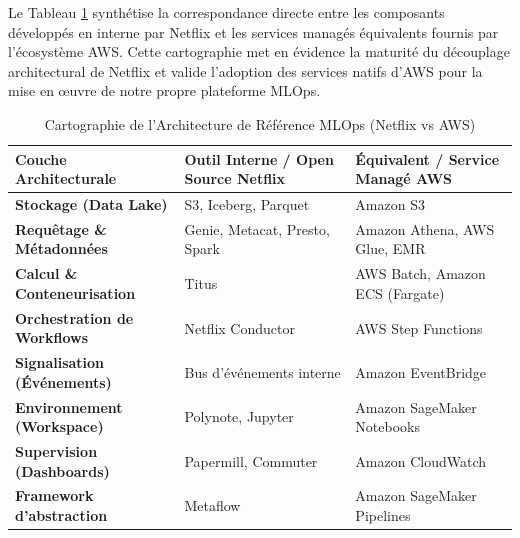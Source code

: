 Le Tableau \ref{tab:netflix_aws_mapping} synthétise la correspondance directe entre les composants développés en interne par Netflix et les services managés équivalents fournis par l'écosystème AWS. Cette cartographie met en évidence la maturité du découplage architectural de Netflix et valide l'adoption des services natifs d'AWS pour la mise en œuvre de notre propre plateforme MLOps.

\begin{table}[H]
\centering
\caption{Cartographie de l'Architecture de Référence MLOps (Netflix vs AWS)}
\label{tab:netflix_aws_mapping}
\renewcommand{\arraystretch}{1.3}
\begin{tabular}{|p{4.5cm}|p{5cm}|p{5cm}|}
\hline
\rowcolor{darkgreen!20} \textbf{Couche Architecturale} & \textbf{Outil Interne / Open Source Netflix} & \textbf{Équivalent / Service Managé AWS} \\ \hline
\textbf{Stockage (Data Lake)} & S3, Iceberg, Parquet \cite{76} & Amazon S3 \cite{76} \\ \hline
\textbf{Requêtage \& Métadonnées} & Genie, Metacat, Presto, Spark \cite{76} & Amazon Athena, AWS Glue, EMR \\ \hline
\textbf{Calcul \& Conteneurisation} & Titus \cite{76} & AWS Batch, Amazon ECS (Fargate) \cite{76} \\ \hline
\textbf{Orchestration de Workflows} & Netflix Conductor \cite{76} & AWS Step Functions \cite{76} \\ \hline
\textbf{Signalisation (Événements)} & Bus d'événements interne \cite{76} & Amazon EventBridge \cite{76} \\ \hline
\textbf{Environnement (Workspace)} & Polynote, Jupyter \cite{76} & Amazon SageMaker Notebooks \cite{76} \\ \hline
\textbf{Supervision (Dashboards)} & Papermill, Commuter \cite{76} & Amazon CloudWatch \\ \hline
\textbf{Framework d'abstraction} & Metaflow \cite{76} & Amazon SageMaker Pipelines \\ \hline
\end{tabular}
\end{table}




